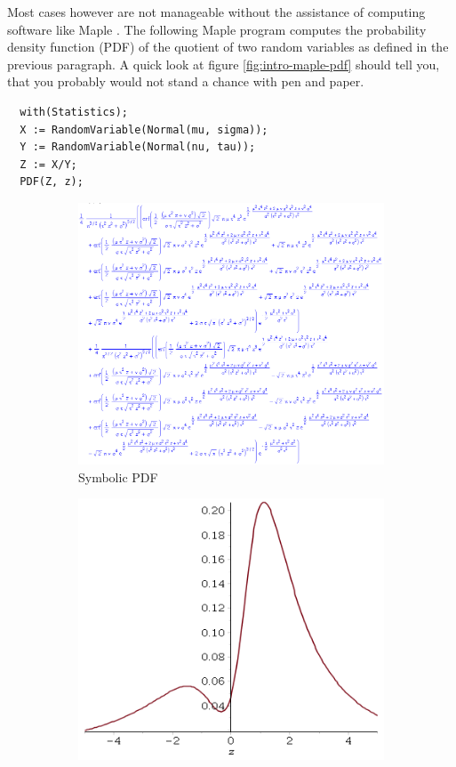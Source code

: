\documentclass[11pt,a4paper]{book}
\begin{document}
Most cases however are not manageable without the assistance of computing
software like Maple \cite{maple}. The following Maple program computes the
probability density function (PDF) of the quotient of two random variables as
defined in the previous paragraph. A quick look at figure
\ref{fig:intro-maple-pdf} should tell you, that you probably would not stand a
chance with pen and paper.
\begin{verbatim}
  with(Statistics);
  X := RandomVariable(Normal(mu, sigma));
  Y := RandomVariable(Normal(nu, tau));
  Z := X/Y;
  PDF(Z, z);
\end{verbatim}
\begin{figure}
  \begin{subfigure}{0.45\textwidth}
    \centering
    \includegraphics[width=\textwidth]{thesis/introduction/maple-pdf}
    \caption{Symbolic PDF}
  \end{subfigure}
  \hfill
  \begin{subfigure}{0.45\textwidth}
    \centering
    \includegraphics[width=\textwidth]{thesis/introduction/maple-plot}

\end{subfigure}
\end{figure}
\end{document}
